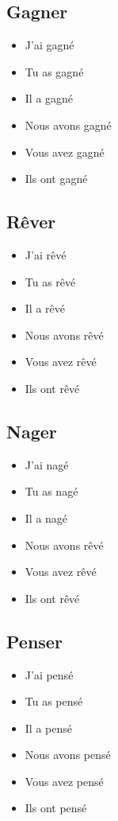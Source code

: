 \subsection{Gagner}

\begin{itemize}
    \item J'ai gagné
    \item Tu as gagné 
    \item Il a gagné
    \item Nous avons gagné 
    \item Vous avez gagné 
    \item Ils ont gagné 
\end{itemize}

\subsection{Rêver}

\begin{itemize}
    \item J'ai rêvé 
    \item Tu as rêvé 
    \item Il a rêvé 
    \item Nous avons rêvé 
    \item Vous avez rêvé 
    \item Ils ont rêvé
\end{itemize}

\subsection{Nager}

\begin{itemize}
    \item J'ai nagé 
    \item Tu as nagé 
    \item Il a nagé 
    \item Nous avons rêvé 
    \item Vous avez rêvé 
    \item Ils ont rêvé
\end{itemize}

\subsection{Penser}

\begin{itemize}
    \item J'ai pensé 
    \item Tu as pensé 
    \item Il a pensé 
    \item Nous avons pensé 
    \item Vous avez pensé 
    \item Ils ont pensé
\end{itemize}

